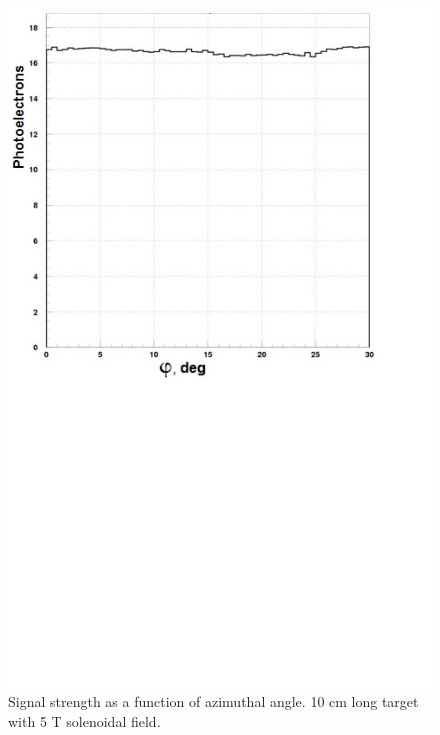 \begin{figure}[!ht]
    \centering
    \includegraphics[width=1.0\linewidth,trim={0.0cm 9.4cm 0.0cm 0.0cm},clip]{images/10cm_Targ_5T_Field_Phi.jpg}
    \caption{Signal strength as a function of azimuthal angle. 10 cm long target with 5 T solenoidal field.}
    \label{fig:10cm_Targ_5T_Field_Phi}
\end{figure}

